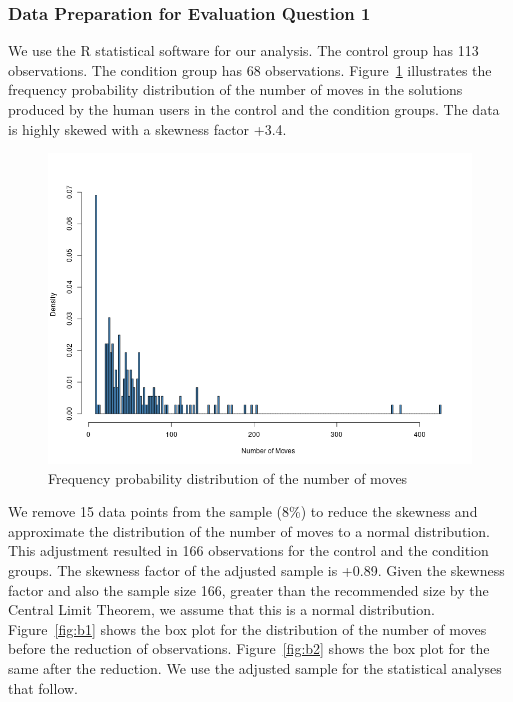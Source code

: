 \subsubsection{Data Preparation for Evaluation Question 1}
We use the R statistical software for our analysis.
The control group has 113 observations.
The condition group has 68 observations.
Figure~\ref{fig:fullhisto} illustrates the frequency probability distribution of the number of moves in the solutions produced by the human users in the control and the condition groups. 
The data is highly skewed with a skewness factor +3.4.
\begin{figure}[tpb]
  \centering
\includegraphics[width=0.7\columnwidth]{img/histo_length.png}
  \caption{Frequency probability distribution of the number of moves}
  \label{fig:fullhisto}
\end{figure}

We remove 15 data points from the sample (8\%) to reduce the skewness and approximate the distribution of the number of moves to a normal distribution.
This adjustment resulted in 166 observations for the control and the condition groups.
The skewness factor of the adjusted sample is +0.89.
Given the skewness factor and also the sample size 166, greater than the recommended size by the Central Limit Theorem, we assume that this is a normal distribution.
Figure~\ref{fig:b1} shows the box plot for the distribution of the number of moves before the reduction of observations.
Figure~\ref{fig:b2} shows the box plot for the same after the reduction.
We use the adjusted sample for the statistical analyses that follow.


